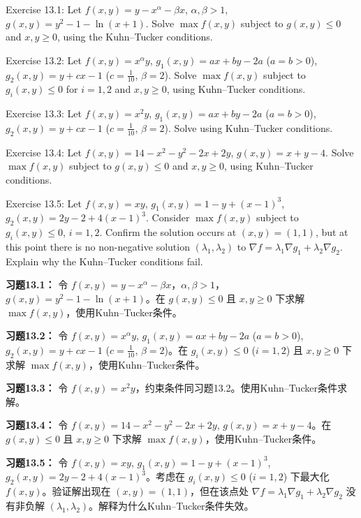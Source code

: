 \begin{original}
Exercise 13.1: Let $f(x, y) = y - x^\alpha - \beta x$, $\alpha, \beta > 1$, $g(x, y) = y^2 - 1 - \ln(x + 1)$. Solve $\max f(x, y)$ subject to $g(x, y) \le 0$ and $x, y \ge 0$, using the Kuhn--Tucker conditions.

Exercise 13.2: Let $f(x, y) = x^{\alpha} y$, $g_1(x, y) = ax + by - 2a$ ($a = b > 0$), $g_2(x, y) = y + cx - 1$ ($c = \frac{1}{10}$, $\beta = 2$). Solve $\max f(x, y)$ subject to $g_i(x, y) \le 0$ for $i = 1,2$ and $x, y \ge 0$, using Kuhn--Tucker conditions.

Exercise 13.3: Let $f(x, y) = x^2 y$, $g_1(x, y) = ax + by - 2a$ ($a = b > 0$), $g_2(x, y) = y + cx - 1$ ($c = \frac{1}{10}$, $\beta = 2$). Solve using Kuhn--Tucker conditions.

Exercise 13.4: Let $f(x, y) = 14 - x^2 - y^2 - 2x + 2y$, $g(x, y) = x + y - 4$. Solve $\max f(x, y)$ subject to $g(x, y) \le 0$ and $x, y \ge 0$, using Kuhn--Tucker conditions.

Exercise 13.5: Let $f(x, y) = x y$, $g_1(x, y) = 1 - y + (x - 1)^3$, $g_2(x, y) = 2y - 2 + 4(x - 1)^3$. Consider $\max f(x, y)$ subject to $g_i(x, y) \le 0$, $i = 1,2$. Confirm the solution occurs at $(x, y) = (1,1)$, but at this point there is no non-negative solution $(\lambda_1,\lambda_2)$ to $\nabla f = \lambda_1 \nabla g_1 + \lambda_2 \nabla g_2$. Explain why the Kuhn--Tucker conditions fail.
\end{original}
\begin{translation}
\textbf{习题13.1：} 令 $f(x, y) = y - x^\alpha - \beta x$，$\alpha, \beta > 1$，$g(x, y) = y^2 - 1 - \ln(x + 1)$。在 $g(x, y) \le 0$ 且 $x, y \ge 0$ 下求解 $\max f(x, y)$，使用Kuhn--Tucker条件。

\textbf{习题13.2：} 令 $f(x, y) = x^{\alpha} y$, $g_1(x, y) = ax + by - 2a$ ($a = b > 0$), $g_2(x, y) = y + cx - 1$ ($c = \frac{1}{10}$, $\beta = 2$)。在 $g_i(x, y) \le 0$ ($i = 1,2$) 且 $x, y \ge 0$ 下求解 $\max f(x, y)$，使用Kuhn--Tucker条件。

\textbf{习题13.3：} 令 $f(x, y) = x^2 y$，约束条件同习题13.2。使用Kuhn--Tucker条件求解。

\textbf{习题13.4：} 令 $f(x, y) = 14 - x^2 - y^2 - 2x + 2y$, $g(x, y) = x + y - 4$。在 $g(x, y) \le 0$ 且 $x, y \ge 0$ 下求解 $\max f(x, y)$，使用Kuhn--Tucker条件。

\textbf{习题13.5：} 令 $f(x, y) = x y$, $g_1(x, y) = 1 - y + (x - 1)^3$, $g_2(x, y) = 2y - 2 + 4(x - 1)^3$。考虑在 $g_i(x, y) \le 0$ ($i = 1,2$) 下最大化 $f(x, y)$。验证解出现在 $(x, y) = (1,1)$，但在该点处 $\nabla f = \lambda_1 \nabla g_1 + \lambda_2 \nabla g_2$ 没有非负解 $(\lambda_1,\lambda_2)$。解释为什么Kuhn--Tucker条件失效。
\end{translation}

